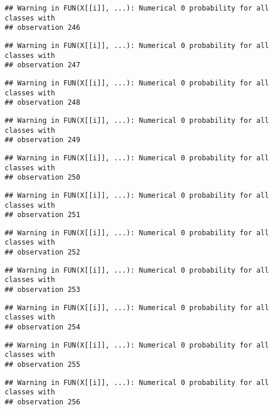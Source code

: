 \documentclass[
]{article}
\begin{document}
\begin{verbatim}
## Warning in FUN(X[[i]], ...): Numerical 0 probability for all classes with
## observation 246
\end{verbatim}

\begin{verbatim}
## Warning in FUN(X[[i]], ...): Numerical 0 probability for all classes with
## observation 247
\end{verbatim}

\begin{verbatim}
## Warning in FUN(X[[i]], ...): Numerical 0 probability for all classes with
## observation 248
\end{verbatim}

\begin{verbatim}
## Warning in FUN(X[[i]], ...): Numerical 0 probability for all classes with
## observation 249
\end{verbatim}

\begin{verbatim}
## Warning in FUN(X[[i]], ...): Numerical 0 probability for all classes with
## observation 250
\end{verbatim}

\begin{verbatim}
## Warning in FUN(X[[i]], ...): Numerical 0 probability for all classes with
## observation 251
\end{verbatim}

\begin{verbatim}
## Warning in FUN(X[[i]], ...): Numerical 0 probability for all classes with
## observation 252
\end{verbatim}

\begin{verbatim}
## Warning in FUN(X[[i]], ...): Numerical 0 probability for all classes with
## observation 253
\end{verbatim}

\begin{verbatim}
## Warning in FUN(X[[i]], ...): Numerical 0 probability for all classes with
## observation 254
\end{verbatim}

\begin{verbatim}
## Warning in FUN(X[[i]], ...): Numerical 0 probability for all classes with
## observation 255
\end{verbatim}

\begin{verbatim}
## Warning in FUN(X[[i]], ...): Numerical 0 probability for all classes with
## observation 256
\end{verbatim}
\end{document}
